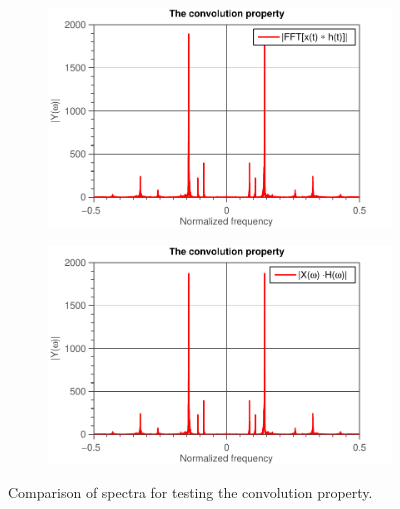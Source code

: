 \documentclass[11pt,titlepage]{report}
\begin{document}
\begin{figure}[H]
	\centering
	\begin{subfigure}{0.49\textwidth}
		\includegraphics[width=\textwidth]{../../deliverable-7-resources/figures/ass-1/report-7/ass-1-report-7-convolution.pdf}
	\end{subfigure}
	\begin{subfigure}{0.49\textwidth}
		\includegraphics[width=\textwidth]{../../deliverable-7-resources/figures/ass-1/report-7/ass-1-report-7-multiplication.pdf}
	\end{subfigure}
	\caption{Comparison of spectra for testing the convolution property.}
	\label{fig:ass-1-rep-7-conv}
\end{figure}
\end{document}
